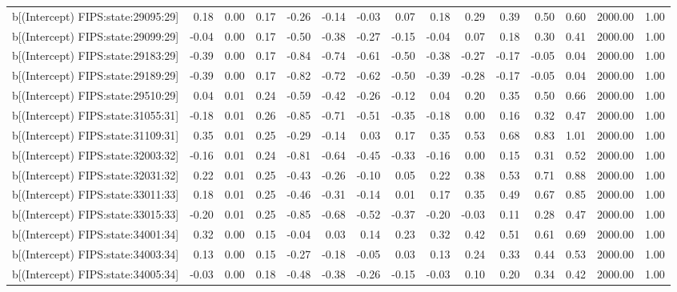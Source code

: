 \begin{table}[ht]
\begin{tabular}{rrrrrrrrrrrrrrr}
  b[(Intercept) FIPS:state:29095:29] & 0.18 & 0.00 & 0.17 & -0.26 & -0.14 & -0.03 & 0.07 & 0.18 & 0.29 & 0.39 & 0.50 & 0.60 & 2000.00 & 1.00 \\ 
  b[(Intercept) FIPS:state:29099:29] & -0.04 & 0.00 & 0.17 & -0.50 & -0.38 & -0.27 & -0.15 & -0.04 & 0.07 & 0.18 & 0.30 & 0.41 & 2000.00 & 1.00 \\ 
  b[(Intercept) FIPS:state:29183:29] & -0.39 & 0.00 & 0.17 & -0.84 & -0.74 & -0.61 & -0.50 & -0.38 & -0.27 & -0.17 & -0.05 & 0.04 & 2000.00 & 1.00 \\ 
  b[(Intercept) FIPS:state:29189:29] & -0.39 & 0.00 & 0.17 & -0.82 & -0.72 & -0.62 & -0.50 & -0.39 & -0.28 & -0.17 & -0.05 & 0.04 & 2000.00 & 1.00 \\ 
  b[(Intercept) FIPS:state:29510:29] & 0.04 & 0.01 & 0.24 & -0.59 & -0.42 & -0.26 & -0.12 & 0.04 & 0.20 & 0.35 & 0.50 & 0.66 & 2000.00 & 1.00 \\ 
  b[(Intercept) FIPS:state:31055:31] & -0.18 & 0.01 & 0.26 & -0.85 & -0.71 & -0.51 & -0.35 & -0.18 & 0.00 & 0.16 & 0.32 & 0.47 & 2000.00 & 1.00 \\ 
  b[(Intercept) FIPS:state:31109:31] & 0.35 & 0.01 & 0.25 & -0.29 & -0.14 & 0.03 & 0.17 & 0.35 & 0.53 & 0.68 & 0.83 & 1.01 & 2000.00 & 1.00 \\ 
  b[(Intercept) FIPS:state:32003:32] & -0.16 & 0.01 & 0.24 & -0.81 & -0.64 & -0.45 & -0.33 & -0.16 & 0.00 & 0.15 & 0.31 & 0.52 & 2000.00 & 1.00 \\ 
  b[(Intercept) FIPS:state:32031:32] & 0.22 & 0.01 & 0.25 & -0.43 & -0.26 & -0.10 & 0.05 & 0.22 & 0.38 & 0.53 & 0.71 & 0.88 & 2000.00 & 1.00 \\ 
  b[(Intercept) FIPS:state:33011:33] & 0.18 & 0.01 & 0.25 & -0.46 & -0.31 & -0.14 & 0.01 & 0.17 & 0.35 & 0.49 & 0.67 & 0.85 & 2000.00 & 1.00 \\ 
  b[(Intercept) FIPS:state:33015:33] & -0.20 & 0.01 & 0.25 & -0.85 & -0.68 & -0.52 & -0.37 & -0.20 & -0.03 & 0.11 & 0.28 & 0.47 & 2000.00 & 1.00 \\ 
  b[(Intercept) FIPS:state:34001:34] & 0.32 & 0.00 & 0.15 & -0.04 & 0.03 & 0.14 & 0.23 & 0.32 & 0.42 & 0.51 & 0.61 & 0.69 & 2000.00 & 1.00 \\ 
  b[(Intercept) FIPS:state:34003:34] & 0.13 & 0.00 & 0.15 & -0.27 & -0.18 & -0.05 & 0.03 & 0.13 & 0.24 & 0.33 & 0.44 & 0.53 & 2000.00 & 1.00 \\ 
  b[(Intercept) FIPS:state:34005:34] & -0.03 & 0.00 & 0.18 & -0.48 & -0.38 & -0.26 & -0.15 & -0.03 & 0.10 & 0.20 & 0.34 & 0.42 & 2000.00 & 1.00 \\ 

\end{tabular}
\end{table}
